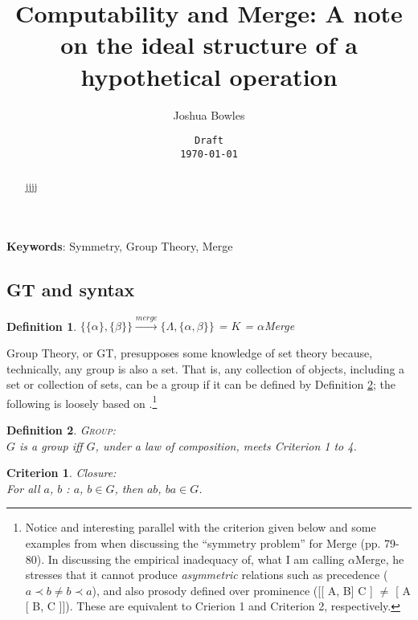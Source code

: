 \documentclass[11pt,twoside]{article}
\theoremstyle{plain}
\newtheorem{criterion}{Criterion}
\newtheorem{definition}{Definition}
\numberwithin{equation}{section}
\theoremstyle{definition}
\newtheorem{phrase string}{Phrase String}
\begin{document}
\title{Computability and Merge: A note on the ideal structure of a hypothetical operation}

\author{Joshua Bowles}
\date{{\tt Draft\\ \today}}
\maketitle

\begin{abstract} jjjj 
\end{abstract}
\textbf{Keywords}: Symmetry, Group Theory, Merge\\


\subsection{GT and syntax}\label{gtsyn:sub}

\begin{definition}																									
$\{\{\alpha\}, \{\beta\}\} \stackrel{merge}{\longrightarrow} 								
\{\Lambda, \{\alpha, \beta\}\}$ = $K$ = $\alpha$Merge \label{amerge}					
\end{definition} 	

Group Theory, or GT, presupposes some knowledge of set theory because, technically, any group is also a set. That is, any collection of objects, including a set or collection of sets, can be a group if it can be defined by Definition \ref{g}; the following is loosely based on \cite{rosen:1995}.\footnote{Notice and interesting parallel with the criterion given below and some examples from \cite{boeckx08bare} when discussing the ``symmetry problem'' for Merge (pp. 79-80). In discussing the empirical inadequacy of, what I am calling $\alpha$Merge, he stresses that it cannot produce \textsl{asymmetric} relations such as precedence ($a \prec b \neq b \prec a$), and also prosody defined over prominence ([[ A, B] C ] $\neq$ [ A [ B, C ]]). These are equivalent to Crierion 1 and Criterion 2, respectively.}

\begin{definition}
\textsc{Group:}\\
$G$ is a group iff $G$, under a law of composition, meets Criterion 1 to 4.\label{g} 
\end{definition}

\begin{criterion}
\textsl{Closure:}\\ For all $a$, $b$ : $a$, $b \in G$, then $ab$, $ba \in G$.
\end{criterion}
\end{document}
